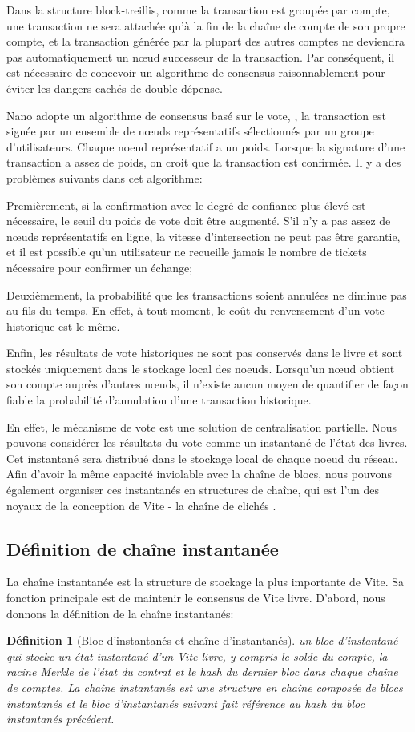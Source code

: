 \documentclass[UTF8,nofonts]{article}
\newtheorem{definition}{Définition}[section]
\begin{document}
\begin{multicols}{2}
Dans la structure block-treillis, comme la transaction est groupée par compte, une transaction ne sera attachée qu'à la fin de la chaîne de compte de son propre compte, et la transaction générée par la plupart des autres comptes ne deviendra pas automatiquement un nœud successeur de la transaction. Par conséquent, il est nécessaire de concevoir un algorithme de consensus raisonnablement pour éviter les dangers cachés de double dépense.

Nano adopte un algorithme de consensus basé sur le vote, \cite{nano}, la transaction est signée par un ensemble de nœuds représentatifs sélectionnés par un groupe d'utilisateurs. Chaque noeud représentatif a un poids. Lorsque la signature d'une transaction a assez de poids, on croit que la transaction est confirmée. Il y a des problèmes suivants dans cet algorithme:

Premièrement, si la confirmation avec le degré de confiance plus élevé est nécessaire, le seuil du poids de vote doit être augmenté. S'il n'y a pas assez de nœuds représentatifs en ligne, la vitesse d'intersection ne peut pas être garantie, et il est possible qu'un utilisateur ne recueille jamais le nombre de tickets nécessaire pour confirmer un échange;

Deuxièmement, la probabilité que les transactions soient annulées ne diminue pas au fils du temps. En effet, à tout moment, le coût du renversement d'un vote historique est le même.

Enfin, les résultats de vote historiques ne sont pas conservés dans le livre et sont stockés uniquement dans le stockage local des noeuds. Lorsqu'un nœud obtient son compte auprès d'autres nœuds, il n'existe aucun moyen de quantifier de façon fiable la probabilité d'annulation d'une transaction historique.

En effet, le mécanisme de vote est une solution de centralisation partielle. Nous pouvons considérer les résultats du vote comme un instantané de l'état des livres. Cet instantané sera distribué dans le stockage local de chaque noeud du réseau. Afin d'avoir la même capacité inviolable avec la chaîne de blocs, nous pouvons également organiser ces instantanés en structures de chaîne, qui est l'un des noyaux de la conception de Vite - la chaîne de clichés \cite{snapshotchain}.

\subsection{Définition de chaîne instantanée}
La chaîne instantanée est la structure de stockage la plus importante de Vite. Sa fonction principale est de maintenir le consensus de Vite livre. D'abord, nous donnons la définition de la chaîne instantanés: 
\begin{definition}[Bloc d'instantanés et chaîne d'instantanés]
un bloc d'instantané qui stocke un état instantané d'un Vite livre, y compris le solde du compte, la racine Merkle de l'état du contrat et le hash du dernier bloc dans chaque chaîne de comptes. La chaîne instantanés est une structure en chaîne composée de blocs instantanés et le bloc d'instantanés suivant fait référence au hash du bloc instantanés précédent.
\end{definition}


\end{multicols}
\end{document}
